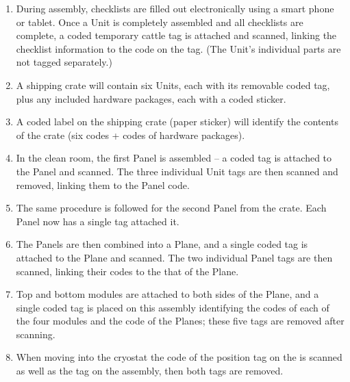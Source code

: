 \begin{enumerate}
\item During assembly,  checklists are filled out electronically using a smart phone or tablet.  Once a  Unit 
is completely assembled and all checklists are complete, a coded temporary cattle tag is attached and scanned, linking the checklist information to the code on the tag. (The  Unit's individual parts are not tagged separately.)
\item %
A shipping crate will contain six %
 Units, each with its removable coded tag, plus any included hardware packages, each with a coded sticker.
\item A coded label on the shipping crate (paper sticker) will %
identify the contents of the crate (six codes + codes of hardware packages). 
\item In the \surf clean room, the first  Panel is assembled -- a coded tag is attached to the  Panel and scanned.  The three individual  Unit tags are then scanned and removed, linking them to the  Panel code.
\item The same procedure is followed for the second  Panel from the crate.  Each  Panel now has a single tag attached it.
\item The %
 Panels are then combined into a  Plane, and a single coded tag is attached to the  Plane and scanned. %
The two individual  Panel tags are then scanned, linking their codes to the that of the  Plane. %
\item Top and bottom  modules 
are attached to both sides of the  Plane, and  a single coded tag is placed on this  assembly identifying the codes of each of the four  modules %
and the code of the  Planes;  %
these five tags are removed after scanning.  
\item When moving into the cryostat the code of the position tag on the  is scanned as well as the tag on the  assembly, then both tags %
are removed.
\end{enumerate}

